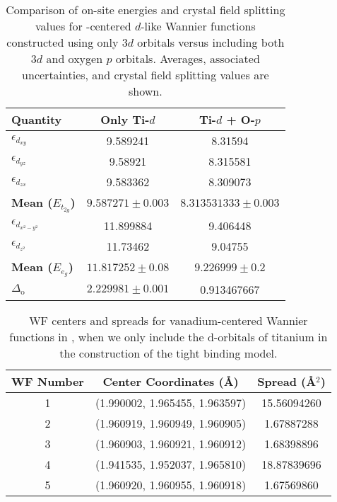 \documentclass[%
 reprint,
 amsmath,amssymb,
 aps,
]{revtex4-2}
\begin{document}
\begin{table}[H]
\centering
\begin{tabular}{|l|c|c|}
\hline
\textbf{Quantity} & \textbf{Only Ti-\(d\)} & \textbf{Ti-\(d\) + O-\(p\)} \\ \hline
$\epsilon_{d_{xy}}$ & 9.589241 & 8.31594 \\ \hline
$\epsilon_{d_{yz}}$ & 9.58921 & 8.315581 \\ \hline
$\epsilon_{d_{zx}}$ & 9.583362 & 8.309073 \\ \hline
\textbf{Mean ($E_{t_{2g}}$)} & \(9.587271 \pm 0.003 \) & \( 8.313531333 \pm 0.003 \)\\ \hline
$\epsilon_{d_{x^2-y^2}}$ & 11.899884 & 9.406448 \\ \hline
$\epsilon_{d_{z^2}}$ & 11.73462 & 9.04755  \\ \hline
\textbf{Mean ($E_{e_{g}}$)} & \(11.817252\pm 0.08 \) & \(9.226999 \pm 0.2 \)  \\ \hline
\textbf{$\Delta_{\text{o}}$} & \(2.229981 \pm 0.001 \) &  0.913467667 \\ \hline
\end{tabular}
\caption{Comparison of on-site energies and crystal field splitting values for -centered \(d\)-like Wannier functions constructed using only \(3d\) orbitals versus including both \(3d\) and oxygen \(p\) orbitals. Averages, associated uncertainties, and crystal field splitting values are shown.}
\end{table}

\begin{table}[H]
\centering

\begin{tabular}{|c|c|c|}
\hline
\textbf{WF Number} & \textbf{Center Coordinates (Å)} & \textbf{Spread (Å\(^2\))} \\ \hline
1 & (1.990002, 1.965455, 1.963597) & 15.56094260 \\ \hline
2 & (1.960919, 1.960949, 1.960905) & 1.67887288 \\ \hline
3 & (1.960903, 1.960921, 1.960912) & 1.68398896 \\ \hline
4 & (1.941535, 1.952037, 1.965810) & 18.87839696 \\ \hline
5 & (1.960920, 1.960955, 1.960918) & 1.67569860 \\ \hline
\end{tabular}
\caption{WF centers and spreads for vanadium-centered Wannier functions in , when we only include the d-orbitals of titanium in the construction of the tight binding model.}
\label{table:wannier-centers-TiPbO3}
\end{table}
\end{document}
